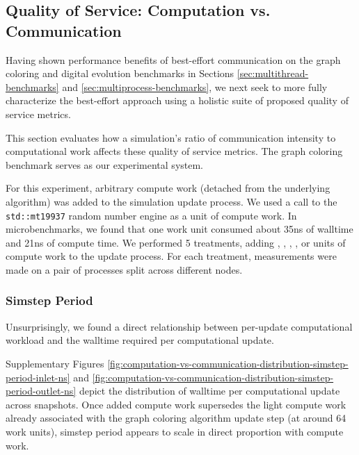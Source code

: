 \subsection{Quality of Service: Computation vs. Communication}
\label{sec:computation-vs-communication}

Having shown performance benefits of best-effort communication on the graph coloring and digital evolution benchmarks in Sections \ref{sec:multithread-benchmarks} and \ref{sec:multiprocess-benchmarks}, we next seek to more fully characterize the best-effort approach using a holistic suite of proposed quality of service metrics.

This section evaluates how a simulation's ratio of communication intensity to computational work affects these quality of service metrics.
The graph coloring benchmark serves as our experimental system.

For this experiment, arbitrary compute work (detached from the underlying algorithm) was added to the simulation update process.
We used a call to the \texttt{std::mt19937} random number engine as a unit of compute work.
In microbenchmarks, we found that one work unit consumed about 35ns of walltime and 21ns of compute time.
We performed 5 treatments, adding , , , , or  units of compute work to the update process.
For each treatment, measurements were made on a pair of processes split across different nodes.

\subsubsection{Simstep Period}

Unsurprisingly, we found a direct relationship between per-update computational workload and the walltime required per computational update.

Supplementary Figures \ref{fig:computation-vs-communication-distribution-simstep-period-inlet-ns} and \ref{fig:computation-vs-communication-distribution-simstep-period-outlet-ns} depict the distribution of walltime per computational update across snapshots.
Once added compute work supersedes the light compute work already associated with the graph coloring algorithm update step (at around 64 work units), simstep period appears to scale in direct proportion with compute work.

